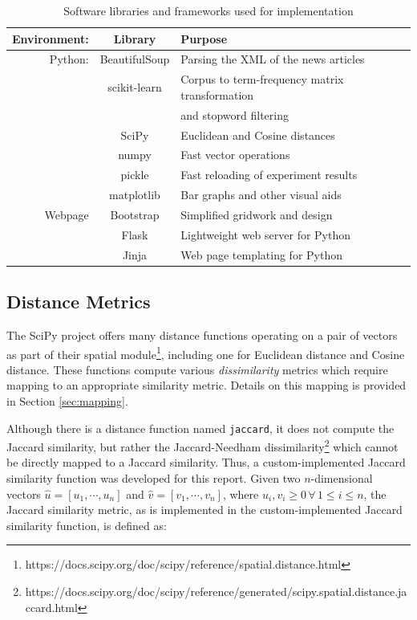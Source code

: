\documentclass[11pt]{article}
\begin{document}
\begin{table}[h] \label{tab:libraries}
	\centering
	\begin{tabular}{ r|c|l }
		\hline
		Environment: & Library & Purpose \\ \hline
		Python: & BeautifulSoup & Parsing the XML of the news articles \\
		&	scikit-learn\cite{scikit-learn} & Corpus to term-frequency matrix transformation \\
		& & and stopword filtering \\
		& 	SciPy\cite{scipy} & Euclidean and Cosine distances \\
		&   numpy & Fast vector operations \\
		&  pickle & Fast reloading of experiment results \\
		& matplotlib & Bar graphs and other visual aids \\ \hline
		Webpage & Bootstrap & Simplified gridwork and design \\
		&  Flask  & Lightweight web server for Python \\
		& Jinja & Web page templating for Python \\ \hline
	\end{tabular}
	
	\caption{Software libraries and frameworks used for implementation}
\end{table}

\subsection{Distance Metrics}

The SciPy project \cite{scipy} offers many distance functions operating on a pair of vectors as part of their spatial module\footnote{
https://docs.scipy.org/doc/scipy/reference/spatial.distance.html
}, including one for Euclidean distance %
and Cosine distance. %
These functions compute various \emph{dissimilarity} metrics which require mapping to an appropriate similarity metric.
Details on this mapping is provided in Section \ref{sec:mapping}. 

Although there is a distance function named \texttt{jaccard}, it does not compute the Jaccard similarity, but rather the Jaccard-Needham dissimilarity\footnote{
https://docs.scipy.org/doc/scipy/reference/generated/scipy.spatial.distance.jaccard.html
} which cannot be directly mapped to a Jaccard similarity.
Thus, a custom-implemented Jaccard similarity function was developed for this report.
Given two $n$-dimensional vectors $\hat{u} = [ u_1, \cdots, u_n ]$ and $\hat{v} = [ v_1, \cdots, v_n ]$, where $u_i, v_i \ge 0 \, \forall \, 1 \le i \le n$, the Jaccard similarity metric, as is implemented in the custom-implemented Jaccard similarity function, is defined as:
\end{document}
